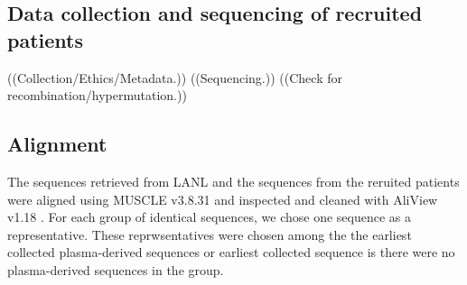 \documentclass[10pt,twocolumn,twoside]{pnas-new}
\begin{document}
{\subsection*{Data collection and sequencing of recruited patients}
((Collection/Ethics/Metadata.))
((Sequencing.))
((Check for recombination/hypermutation.))
\subsection*{Alignment}
The sequences retrieved from LANL and the sequences from the reruited patients were aligned using MUSCLE v3.8.31 \cite{muscle} and inspected and cleaned with AliView v1.18 \cite{aliview}.
For each group of identical sequences, we chose one sequence as a representative.
These reprwsentatives were chosen among the the earliest collected plasma-derived sequences or earliest collected sequence is there were no plasma-derived sequences in the group.
}
\end{document}
